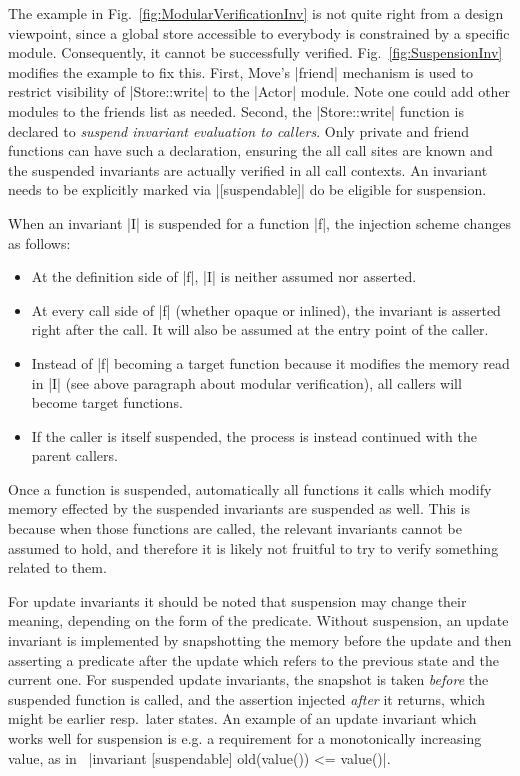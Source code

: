 The example in Fig.~\ref{fig:ModularVerificationInv} is not quite right from a
design viewpoint, since a global store accessible to everybody is constrained by
a specific module. Consequently, it cannot be successfully
verified. Fig.~\ref{fig:SuspensionInv} modifies the example to fix this. First,
Move's |friend| mechanism is used to restrict visibility of |Store::write| to
the |Actor| module. Note one could add other modules to the friends list as
needed.  Second, the |Store::write| function is declared to \emph{suspend
  invariant evaluation to callers}. Only private and friend functions can have
such a declaration, ensuring the all call sites are known and the suspended
invariants are actually verified in all call contexts.  An invariant needs to be
explicitly marked via |[suspendable]| do be eligible for suspension.

When an invariant |I| is suspended for a function |f|, the injection scheme changes
as follows:

\begin{itemize}
\item At the definition side of |f|, |I| is neither assumed nor asserted.
\item At every call side of |f| (whether opaque or inlined), the invariant
  is asserted right after the call. It will also be assumed at the entry point
  of the caller.
\item Instead of |f| becoming a target function because it modifies the memory
  read in |I| (see above paragraph about modular verification), all callers will
  become target functions.
\item If the caller is itself suspended, the process is instead continued with
  the parent callers.
\end{itemize}

Once a function is suspended, automatically all functions it calls which modify
memory effected by the suspended invariants are suspended as well. This is
because when those functions are called, the relevant invariants cannot be
assumed to hold, and therefore it is likely not fruitful to try to verify
something related to them.

For update invariants it should be noted that suspension may change their
meaning, depending on the form of the predicate. Without suspension, an update
invariant is implemented by snapshotting the memory before the update and then
asserting a predicate after the update which refers to the previous state and
the current one. For suspended update invariants, the snapshot is taken
\emph{before} the suspended function is called, and the assertion injected
\emph{after} it returns, which might be earlier resp.~later states. An example
of an update invariant which works well for suspension is e.g. a requirement for
a monotonically increasing value, as in~%
|invariant [suspendable] old(value()) <= value()|.

